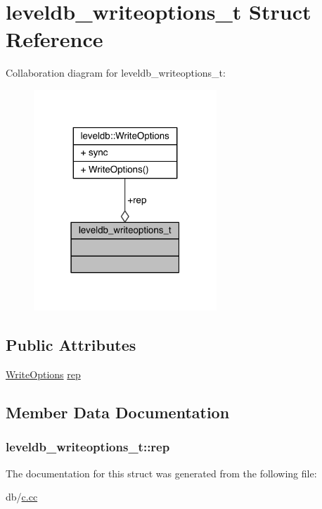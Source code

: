 \hypertarget{structleveldb__writeoptions__t}{}\section{leveldb\+\_\+writeoptions\+\_\+t Struct Reference}
\label{structleveldb__writeoptions__t}


Collaboration diagram for leveldb\+\_\+writeoptions\+\_\+t\+:\nopagebreak
\begin{figure}[H]
\begin{center}
\leavevmode
\includegraphics[width=195pt]{structleveldb__writeoptions__t__coll__graph}
\end{center}
\end{figure}
\subsection*{Public Attributes}
\begin{DoxyCompactItemize}
\item 
\hyperlink{structleveldb_1_1_write_options}{Write\+Options} \hyperlink{structleveldb__writeoptions__t_ad51ccdc92007bd69dcb075bba4aef788}{rep}
\end{DoxyCompactItemize}


\subsection{Member Data Documentation}
\hypertarget{structleveldb__writeoptions__t_ad51ccdc92007bd69dcb075bba4aef788}{}
\subsubsection[{rep}]{ leveldb\+\_\+writeoptions\+\_\+t\+::rep}\label{structleveldb__writeoptions__t_ad51ccdc92007bd69dcb075bba4aef788}


The documentation for this struct was generated from the following file\+:\begin{DoxyCompactItemize}
\item 
db/\hyperlink{c_8cc}{c.\+cc}\end{DoxyCompactItemize}
